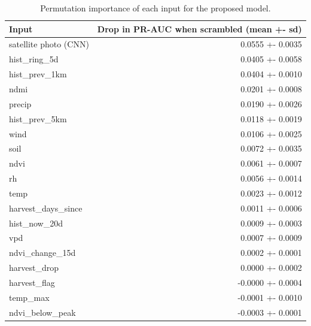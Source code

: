 \begin{table}[t]
\centering
\caption{Permutation importance of each input for the proposed model.}
\label{tab:table5_importance}
\begin{tabular}{lr}
\hline
Input & Drop in PR-AUC when scrambled (mean +- sd) \\
\hline
satellite photo (CNN) & 0.0555 +- 0.0035 \\
hist\_ring\_5d & 0.0405 +- 0.0058 \\
hist\_prev\_1km & 0.0404 +- 0.0010 \\
ndmi & 0.0201 +- 0.0008 \\
precip & 0.0190 +- 0.0026 \\
hist\_prev\_5km & 0.0118 +- 0.0019 \\
wind & 0.0106 +- 0.0025 \\
soil & 0.0072 +- 0.0035 \\
ndvi & 0.0061 +- 0.0007 \\
rh & 0.0056 +- 0.0014 \\
temp & 0.0023 +- 0.0012 \\
harvest\_days\_since & 0.0011 +- 0.0006 \\
hist\_now\_20d & 0.0009 +- 0.0003 \\
vpd & 0.0007 +- 0.0009 \\
ndvi\_change\_15d & 0.0002 +- 0.0001 \\
harvest\_drop & 0.0000 +- 0.0002 \\
harvest\_flag & -0.0000 +- 0.0004 \\
temp\_max & -0.0001 +- 0.0010 \\
ndvi\_below\_peak & -0.0003 +- 0.0001 \\
\hline
\end{tabular}
\end{table}
